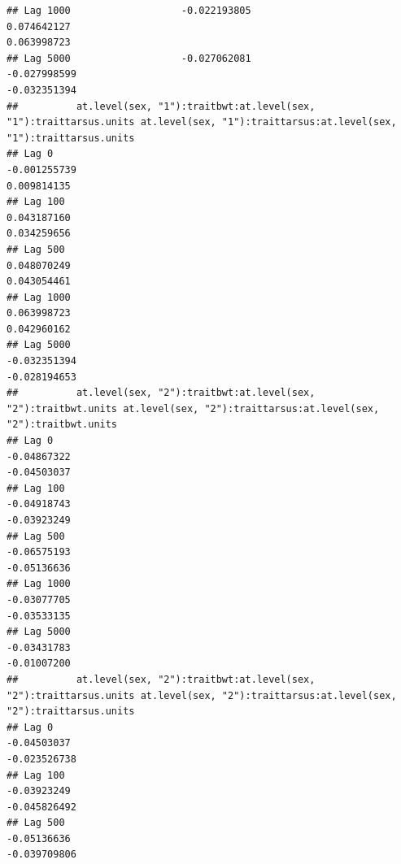 \documentclass[
  12pt,
]{book}
\begin{document}
\begin{verbatim}
## Lag 1000                   -0.022193805                                                   0.074642127                                                      0.063998723
## Lag 5000                   -0.027062081                                                  -0.027998599                                                     -0.032351394
##          at.level(sex, "1"):traitbwt:at.level(sex, "1"):traittarsus.units at.level(sex, "1"):traittarsus:at.level(sex, "1"):traittarsus.units
## Lag 0                                                        -0.001255739                                                         0.009814135
## Lag 100                                                       0.043187160                                                         0.034259656
## Lag 500                                                       0.048070249                                                         0.043054461
## Lag 1000                                                      0.063998723                                                         0.042960162
## Lag 5000                                                     -0.032351394                                                        -0.028194653
##          at.level(sex, "2"):traitbwt:at.level(sex, "2"):traitbwt.units at.level(sex, "2"):traittarsus:at.level(sex, "2"):traitbwt.units
## Lag 0                                                      -0.04867322                                                      -0.04503037
## Lag 100                                                    -0.04918743                                                      -0.03923249
## Lag 500                                                    -0.06575193                                                      -0.05136636
## Lag 1000                                                   -0.03077705                                                      -0.03533135
## Lag 5000                                                   -0.03431783                                                      -0.01007200
##          at.level(sex, "2"):traitbwt:at.level(sex, "2"):traittarsus.units at.level(sex, "2"):traittarsus:at.level(sex, "2"):traittarsus.units
## Lag 0                                                         -0.04503037                                                        -0.023526738
## Lag 100                                                       -0.03923249                                                        -0.045826492
## Lag 500                                                       -0.05136636                                                        -0.039709806

\end{verbatim}
\end{document}
